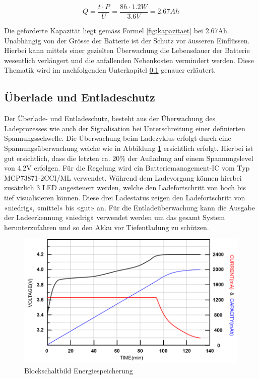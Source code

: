 \begin{equation}
Q=\frac{t\cdot P}{U}=\frac{8h\cdot 1.2W}{3.6V}=2.67Ah
\label{fig:kapazitaet}
\end{equation}

Die geforderte Kapazität liegt gemäss Formel \ref{fig:kapazitaet} bei 2.67Ah. Unabhängig von der Grösse der Batterie ist der Schutz vor äusseren Einflüssen. Hierbei kann mittels einer gezielten Überwachung die Lebensdauer der Batterie wesentlich verlängert und die anfallenden Nebenkosten vermindert werden. Diese Thematik wird im nachfolgenden Unterkapitel \ref{Überlade und Entladeschutz} genauer erläutert.
                                         
\subsection{Überlade und Entladeschutz}  \label{Überlade und Entladeschutz}

Der Überlade- und Entladeschutz, besteht aus der Überwachung des Ladeprozesses wie auch der Signalisation bei Unterschreitung einer definierten Spannungsschwelle. Die Überwachung beim Ladezyklus erfolgt durch eine Spannungsüberwachung welche wie in Abbildung \ref{fig:Ladekurve Li-Ion Akku} ersichtlich erfolgt. Hierbei ist gut ersichtlich, dass die letzten ca. 20\% der Aufladung auf einem Spannungslevel von 4.2V erfolgen. Für die Regelung wird ein Batteriemanagement-IC vom Typ MCP73871-2CCI/ML verwendet.
Während dem Ladevorgang können hierbei zusätzlich 3 LED angesteuert werden, welche den Ladefortschritt von hoch bis tief visualisieren können. Diese drei Ladestatus zeigen den Ladefortschritt von «niedrig», «mittel» bis «gut» an. Für die Entladeüberwachung kann die Ausgabe der Ladeerkennung «niedrig» verwendet werden um das gesamt System herunterzufahren und so den Akku vor Tiefentladung zu schützen.

\begin{figure}[H]
	\begin{center}
		\includegraphics[width=120mm]{data/LadekurveLiIon.png}
		\caption{Blockschaltbild Energiespeicherung} %
		\label{fig:Ladekurve Li-Ion Akku}
	\end{center}
\end{figure}
